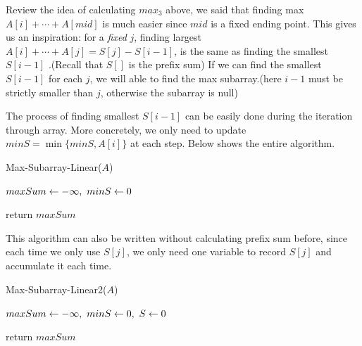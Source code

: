 \begin{spacing}{1.3}
    Review the idea of calculating $max_3$ above, we said that 
    finding max $A[i]+\cdots +A[mid]$ is much easier since $mid$
    is a fixed ending point. This gives us an inspiration:
    for a {\it fixed} $j$, finding largest $A[i]+\cdots +A[j]=
    S[j]-S[i-1]$, is the same as finding the smallest $S[i-1]$
    .(Recall that $S[]$ is the prefix sum)
    If we can find the smallest $S[i-1]$ for each $j$,
    we will able to find the max subarray.(here $i-1$ must 
    be strictly smaller than $j$, otherwise the subarray is null)

    The process of finding smallest $S[i-1]$ can be easily done 
    during the iteration through array. More concretely, 
    we only need to update $minS = \min\{minS, A[i]\}$ at each step.
    Below shows the entire algorithm.
    
    \begin{algorithm}
        \caption{Max-Subarray-Linear($A$)}
        $maxSum \leftarrow -\infty,\ minS\leftarrow 0$

        return $maxSum$
    \end{algorithm}

    This algorithm can also be written without calculating prefix sum 
    before, since each time we only use $S[j]$, we only need one
    variable to record $S[j]$ and accumulate it each time.

    \newpage
    \begin{algorithm}
        \caption{Max-Subarray-Linear2($A$)}
        $maxSum \leftarrow -\infty,\ minS\leftarrow 0,\ S\leftarrow 0$

        return $maxSum$
    \end{algorithm}


\end{spacing}
